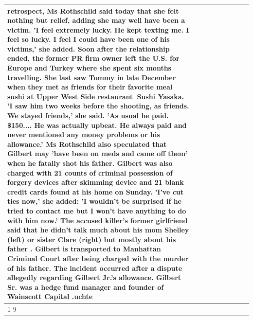 \begin{table}[H]
\begin{tabular}{lllrlllll}
retrospect, Ms Rothschild said today that she felt nothing but relief, adding she may well have been a victim. 'I feel extremely lucky. He kept texting me. I feel so lucky. I feel I could have been one of his victims,' she added. Soon after the relationship ended, the former PR firm owner left the U.S. for Europe and Turkey where she spent six months  travelling. She last saw Tommy in late December when they met as friends for their favorite meal sushi at Upper West Side restaurant Sushi Yasaka. 'I saw him two weeks before the shooting, as friends. We stayed friends,' she said. 'As usual he paid. \$150.... He was actually upbeat. He always paid and never mentioned any money problems or his allowance.' Ms Rothschild also speculated that Gilbert may 'have been on meds and came off them' when he fatally shot his father. Gilbert was also charged with 21 counts of criminal possession of forgery devices after skimming device and 21 blank credit cards found at his home on Sunday. 'I've cut ties now,' she added: 'I wouldn’t be surprised if he tried to contact me but I won’t have anything to do with him now.' The accused killer's former girlfriend said that he didn't talk much about his mom Shelley (left) or sister Clare (right) but mostly about his father . Gilbert is transported to Manhattan Criminal Court  after being charged with the murder of his father. The incident occurred after a dispute allegedly regarding Gilbert Jr.'s allowance. Gilbert Sr. was a hedge fund manager and founder of Wainscott Capital .uchte \\
\cline{1-9} \cline{2-9}

\end{tabular}
\end{table}
